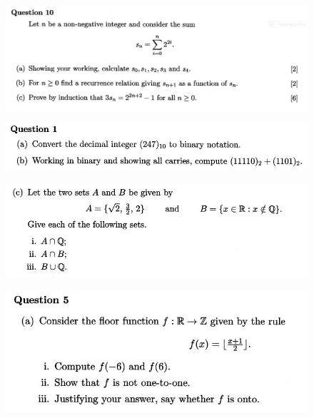 \documentclass[]{article}
\begin{document}
\newpage
\begin{figure}[h!]
	\centering  
	\includegraphics[width=1.5\linewidth]{"HC 2012 ZA Q10"}  
\end{figure}
\newpage
\begin{figure}[h!]
\centering
\includegraphics[width=1.5\linewidth]{"HC 2012 ZA Q1abJPG"}

\end{figure}
\newpage
\begin{figure}[h!]
	\centering 
	\includegraphics[width=1.5\linewidth]{"HC 2012 ZA Q1c"}   
\end{figure}
\newpage
\begin{figure}[h!]
	\centering  
	\includegraphics[width=1.5\linewidth]{"HC 2012 ZA Q5a"} 
\end{figure}
\end{document}
